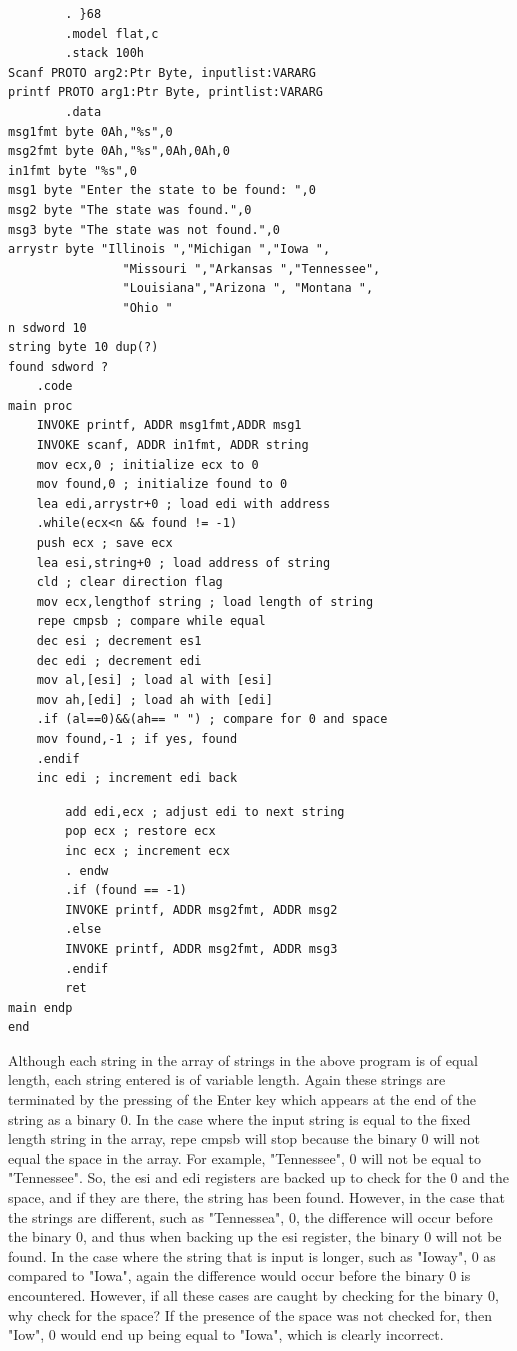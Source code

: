 \documentclass[10pt]{book}
\begin{document}
\begin{verbatim}
        . }68
        .model flat,c
        .stack 100h
Scanf PROTO arg2:Ptr Byte, inputlist:VARARG
printf PROTO arg1:Ptr Byte, printlist:VARARG
        .data
msg1fmt byte 0Ah,"%s",0
msg2fmt byte 0Ah,"%s",0Ah,0Ah,0
in1fmt byte "%s",0
msg1 byte "Enter the state to be found: ",0
msg2 byte "The state was found.",0
msg3 byte "The state was not found.",0
arrystr byte "Illinois ","Michigan ","Iowa ",
                "Missouri ","Arkansas ","Tennessee",
                "Louisiana","Arizona ", "Montana ",
                "Ohio "
n sdword 10
string byte 10 dup(?)
found sdword ?
    .code
main proc
    INVOKE printf, ADDR msg1fmt,ADDR msg1
    INVOKE scanf, ADDR in1fmt, ADDR string
    mov ecx,0 ; initialize ecx to 0
    mov found,0 ; initialize found to 0
    lea edi,arrystr+0 ; load edi with address
    .while(ecx<n && found != -1)
    push ecx ; save ecx
    lea esi,string+0 ; load address of string
    cld ; clear direction flag
    mov ecx,lengthof string ; load length of string
    repe cmpsb ; compare while equal
    dec esi ; decrement es1
    dec edi ; decrement edi
    mov al,[esi] ; load al with [esi]
    mov ah,[edi] ; load ah with [edi]
    .if (al==0)&&(ah== " ") ; compare for 0 and space
    mov found,-1 ; if yes, found
    .endif
    inc edi ; increment edi back
\end{verbatim}

\begin{verbatim}
        add edi,ecx ; adjust edi to next string
        pop ecx ; restore ecx
        inc ecx ; increment ecx
        . endw
        .if (found == -1)
        INVOKE printf, ADDR msg2fmt, ADDR msg2
        .else
        INVOKE printf, ADDR msg2fmt, ADDR msg3
        .endif
        ret
main endp
end
\end{verbatim}

Although each string in the array of strings in the above program is of equal length, each string entered is of variable length. Again these strings are terminated by the pressing of the Enter key which appears at the end of the string as a binary 0. In the case where the input string is equal to the fixed length string in the array, repe cmpsb will stop because the binary 0 will not equal the space in the array. For example, "Tennessee", 0 will not be equal to "Tennessee". So, the esi and edi registers are backed up to check for the 0 and the space, and if they are there, the string has been found.
However, in the case that the strings are different, such as "Tennessea", 0, the difference will occur before the binary 0, and thus when backing up the esi register, the binary 0 will not be found. In the case where the string that is input is longer, such as "Ioway", 0 as compared to "Iowa", again the difference would occur before the binary 0 is encountered. However, if all these cases are caught by checking for the binary 0, why check for the space? If the presence of the space was not checked for, then "Iow", 0 would end up being equal to "Iowa", which is clearly incorrect.
\end{document}
